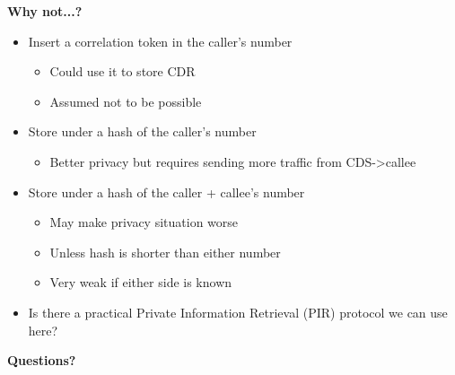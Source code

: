 \documentclass[helvetica]{seminar}
\newcommand{\heading}[1]{%
  \begin{center} 
    \large\bf 
    #1 
  \end{center} 
  \vspace{.4 in}}
\begin{document}
\begin{slide}
\heading{Why not...?}

\vspace{-.2in}
\begin{itemize}
\item Insert a correlation token in the caller's number
  \begin{itemize}
  \item Could use it to store CDR
  \item Assumed not to be possible
  \end{itemize}

\item Store under a hash of the caller's number
  \begin{itemize}
  \item Better privacy but requires sending more traffic from CDS->callee
  \end{itemize}

\item Store under a hash of the caller + callee's number
  \begin{itemize}
  \item May make privacy situation worse
  \item Unless hash is shorter than either number
  \item Very weak if either side is known
  \end{itemize}

\item Is there a practical Private Information Retrieval (PIR) protocol we can use here?
\end{itemize}

\end{slide}

\begin{slide}
\heading{Questions?}
\end{slide}
\end{document}
